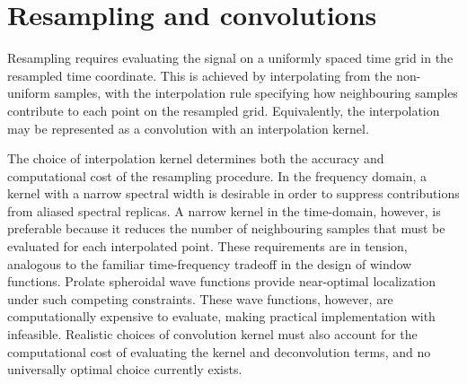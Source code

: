 \documentclass[aps,prd,amsmath,floats,floatfix, twocolumn,
superscriptaddress,nofootinbib,showpacs]{revtex4-2}
\newcommand{\nl}[1]{\textcolor{blue}{NL: #1}}
\begin{document}
\appendix
\section{Resampling and convolutions}
\label{sec:resampling_convolution}
Resampling requires evaluating the signal on a uniformly spaced time grid in the resampled time coordinate. This is achieved by interpolating from the non-uniform samples, with the interpolation rule specifying how neighbouring samples contribute to each point on the resampled grid. Equivalently, the interpolation may be represented as a convolution with an interpolation kernel.

The choice of interpolation kernel determines both the accuracy and computational cost of the resampling procedure. In the frequency domain, a kernel with a narrow spectral width is desirable in order to suppress contributions from aliased spectral replicas. A narrow kernel in the time-domain, however, is preferable because it reduces the number of neighbouring samples that must be evaluated for each interpolated point. These requirements are in tension, analogous to the familiar time-frequency tradeoff in the design of window functions. Prolate spheroidal wave functions provide near-optimal localization under such competing constraints. These wave functions, however, are computationally expensive to evaluate, making practical implementation with infeasible. Realistic choices of convolution kernel must also account for the computational cost of evaluating the kernel and deconvolution terms, and no universally optimal choice currently exists.

\end{document}
